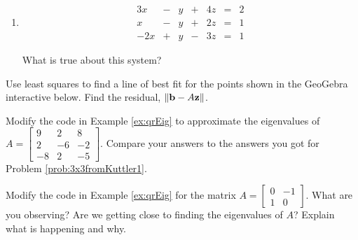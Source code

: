 \documentclass{ximera}
\begin{document}
\begin{problem}
\begin{enumerate}
    \item 
    \begin{equation}
\begin{array}{ccccccccc}
      3x &- &y&+&4z&= &2 \\
	 x&-&y&+&2z&=&1\\
     -2x&+&y&-&3z&=&1
    \end{array}
    \end{equation}

    What is true about this system?
    \begin{multipleChoice}
    \end{multipleChoice}

         \end{enumerate}
\end{problem}

\begin{problem}\label{prob_oct_lineFit}
  Use least squares to find a line of best fit for the points shown in the GeoGebra interactive below. Find the residual, $\left\lVert\mathbf{b}-A\mathbf{z}\right\rVert$.  

  \begin{center}
  \end{center}
\end{problem}

\begin{problem}\label{prob_oct_qr1}
Modify the code in Example \ref{ex:qrEig} to approximate the eigenvalues of $A=\begin{bmatrix} 9 & 2 & 8\\ 2 & -6 & -2\\ -8 & 2 & -5\end{bmatrix}$.  Compare your answers to the answers you got for Problem \ref{prob:3x3fromKuttler1}. 
\end{problem}

\begin{problem}\label{prob_oct_qr2}
  Modify the code in Example \ref{ex:qrEig} for the matrix $A=\begin{bmatrix} 0 & -1\\ 1 & 0 \end{bmatrix}$.  What are you observing?  Are we getting close to finding the eigenvalues of $A$?  Explain what is happening and why.
  \end{problem}
\end{document}
